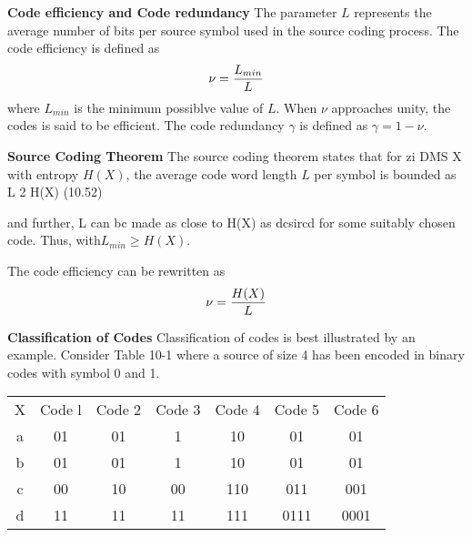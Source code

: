 



\noindent \textbf{Code efficiency and Code redundancy}
The parameter $L$ represents the average number of bits per source symbol used in the source coding process.
The code efficiency is defined as \[\nu = {L_{min} \over L} \]where $L_{min}$ is the minimum possiblve value of $L$. When $\nu$ approaches unity, the codes is said to be efficient.
The code redundancy $\gamma$ is defined as $\gamma = 1- \nu$.




\noindent \textbf{Source Coding Theorem}
The source coding theorem states that for zi DMS X with entropy $H(X)$, the average code word length $L$ per symbol is bounded as
L 2 H(X) (10.52)

and further, L can bc made as close to H(X) as dcsircd for some suitably chosen code.
Thus, with$ L_{min} \geq H(X)$.

The code efficiency can be rewritten as
\[\nu = {H(X) \over L} \]



\noindent \textbf{ Classification of Codes}
Classification of codes is best illustrated by an example. Consider Table 10-1 where a source of
size 4 has been encoded in binary codes with symbol 0 and 1.\\ \bigskip
\begin{tabular}{c c c c c c c}
X& Code l& Code 2& Code 3 &Code 4& Code 5& Code 6\\
a& 01& 01 &1 &10 &01 &01\\
b& 01& 01 &1 &10 &01 &01\\
c &00 &10& 00& 110& 011 &001\\
d &11& 11& 11& 111 &0111 &0001\\
\end{tabular}





